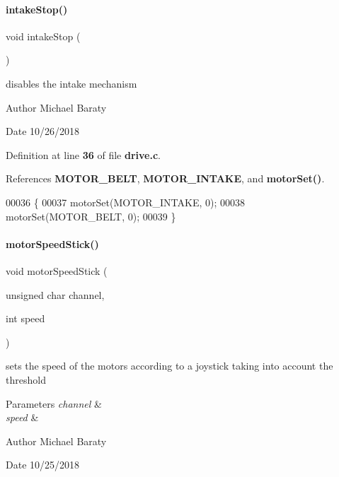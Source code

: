 \paragraph{intake\+Stop()}
{\footnotesize\ttfamily void intake\+Stop (\begin{DoxyParamCaption}{ }\end{DoxyParamCaption})}



disables the intake mechanism 

\begin{DoxyAuthor}{Author}
Michael Baraty 
\end{DoxyAuthor}
\begin{DoxyDate}{Date}
10/26/2018 
\end{DoxyDate}


Definition at line \textbf{ 36} of file \textbf{ drive.\+c}.



References \textbf{ M\+O\+T\+O\+R\+\_\+\+B\+E\+LT}, \textbf{ M\+O\+T\+O\+R\+\_\+\+I\+N\+T\+A\+KE}, and \textbf{ motor\+Set()}.


\begin{DoxyCode}
00036                   \{
00037   motorSet(MOTOR_INTAKE, 0);
00038   motorSet(MOTOR_BELT, 0);
00039 \}
\end{DoxyCode}
\mbox{\label{drive_8h_abccc286b38b665e7171bee0b5a2c2834}} 
\paragraph{motor\+Speed\+Stick()}
{\footnotesize\ttfamily void motor\+Speed\+Stick (\begin{DoxyParamCaption}\item[{unsigned char}]{channel,  }\item[{int}]{speed }\end{DoxyParamCaption})}



sets the speed of the motors according to a joystick taking into account the threshold 


\begin{DoxyParams}{Parameters}
{\em channel} & \\
\hline
{\em speed} & \\
\hline
\end{DoxyParams}
\begin{DoxyAuthor}{Author}
Michael Baraty 
\end{DoxyAuthor}
\begin{DoxyDate}{Date}
10/25/2018 
\end{DoxyDate}
\mbox{\label{drive_8h_af9b0c744a3f92085b9e6d2c9a3341492}} 
